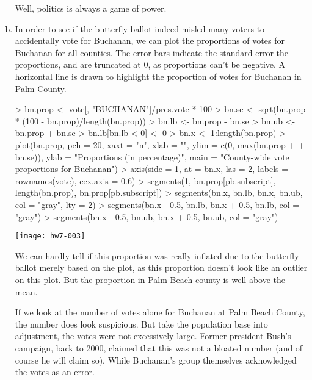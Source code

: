 \documentclass{article}
\begin{document}
\begin{enumerate}[(a)]
        Well, politics is always a game of power.
    \item In order to see if the butterfly ballot indeed misled many voters to accidentally vote for Buchanan, we can plot the proportions of votes for Buchanan for all counties. The error bars indicate the standard error the proportions, and are truncated at 0, as proportions can't be negative. A horizontal line is drawn to highlight the proportion of votes for Buchanan in Palm County.
\begin{Schunk}
\begin{Sinput}
> bn.prop <- vote[, "BUCHANAN"]/pres.vote * 100
> bn.se <- sqrt(bn.prop * (100 - bn.prop)/length(bn.prop))
> bn.lb <- bn.prop - bn.se
> bn.ub <- bn.prop + bn.se
> bn.lb[bn.lb < 0] <- 0
> bn.x <- 1:length(bn.prop)
> plot(bn.prop, pch = 20, xaxt = "n", xlab = "", ylim = c(0, max(bn.prop + 
+     bn.se)), ylab = "Proportions (in percentage)", main = "County-wide vote proportions for Buchanan")
> axis(side = 1, at = bn.x, las = 2, labels = rownames(vote), cex.axis = 0.6)
> segments(1, bn.prop[pb.subscript], length(bn.prop), bn.prop[pb.subscript])
> segments(bn.x, bn.lb, bn.x, bn.ub, col = "gray", lty = 2)
> segments(bn.x - 0.5, bn.lb, bn.x + 0.5, bn.lb, col = "gray")
> segments(bn.x - 0.5, bn.ub, bn.x + 0.5, bn.ub, col = "gray")
\end{Sinput}
\end{Schunk}
\texttt{[image: hw7-003]}

    We can hardly tell if this proportion was really inflated due to the butterfly ballot merely based on the plot, as this proportion doesn't look like an outlier on this plot. But the proportion in Palm Beach county is well above the mean. 

    If we look at the number of votes alone for Buchanan at Palm Beach County, the number does look suspicious. But take the population base into adjustment, the votes were not excessively large. Former president Bush's campaign, back to 2000, claimed that this was not a bloated number (and of course he will claim so). While Buchanan's group themselves acknowledged the votes as an error.
    

\end{enumerate}
\end{document}
